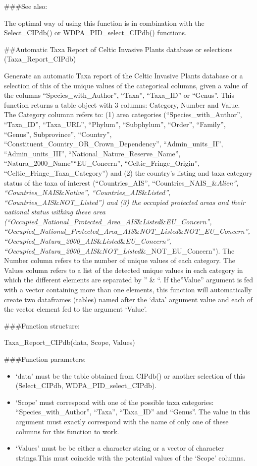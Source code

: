 \documentclass[
]{article}
\providecommand{\tightlist}{%
  \setlength{\itemsep}{0pt}\setlength{\parskip}{0pt}}
\begin{document}
\#\#\#See also:

The optimal way of using this function is in combination with the
Select\_CIPdb() or WDPA\_PID\_select\_CIPdb() functions.

\#\#Automatic Taxa Report of Celtic Invasive Plants database or
selections (Taxa\_Report\_CIPdb)

Generate an automatic Taxa report of the Celtic Invasive Plants database
or a selection of this of the unique values of the categorical columns,
given a value of the columns ``Species\_with\_Author'', ``Taxa'',
``Taxa\_ID'' or ``Genus''. This function returns a table object with 3
columns: Category, Number and Value. The Category columnn refers to: (1)
area categories (``Species\_with\_Author'', ``Taxa\_ID'', ``Taxa\_URL'',
``Phylum'', ``Subphylum'', ``Order'', ``Family'', ``Genus'',
Subprovince'', ``Country'',
``Constituent\_Country\_OR\_Crown\_Dependency'', ``Admin\_units\_II'',
``Admin\_units\_III'', ``National\_Nature\_Reserve\_Name'',
``Natura\_2000\_Name''``EU\_Concern'', ``Celtic\_Fringe\_Origin'',
``Celtic\_Fringe\_Taxa\_Category'') and (2) the country's listing and
taxa category status of the taxa of interest (``Countries\_AIS'',
``Countries\_NAIS\_\&\emph{Alien'', ``Countries\_NAIS}\&\emph{Native'',
``Countries\_AIS}\&\emph{Listed'',
``Countries\_AIS}\&\emph{NOT\_Listed'') and (3) the occupied protected
areas and their national status withing these area
(``Occupied\_National\_Protected\_Area\_AIS}\&\emph{Listed}\&\emph{EU\_Concern'',
``Occupied\_National\_Protected\_Area\_AIS}\&\emph{NOT\_Listed}\&\emph{NOT\_EU\_Concern'',
``Occupied\_Natura\_2000\_AIS}\&\emph{Listed}\&\emph{EU\_Concern'',
``Occupied\_Natura\_2000\_AIS}\&\emph{NOT\_Listed}\&\_NOT\_EU\_Concern'').
The Number column refers to the number of unique values of each
category. The Values column refers to a list of the detected unique
values in each category in which the different elements are separated by
'' \& ``. If the''Value'' argument is fed with a vector containing more
than one elements, this function will automatically create two
dataframes (tables) named after the `data' argument value and each of
the vector element fed to the argument `Value'.

\#\#\#Function structure:

Taxa\_Report\_CIPdb(data, Scope, Values)

\#\#\#Function parameters:

\begin{itemize}
\tightlist
\item
  `data' must be the table obtained from CIPdb() or another selection of
  this (Select\_CIPdb, WDPA\_PID\_select\_CIPdb).
\item
  `Scope' must correspond with one of the possible taxa categories:
  ``Species\_with\_Author'', ``Taxa'', ``Taxa\_ID'' and ``Genus''. The
  value in this argument must exactly correspond with the name of only
  one of these columns for this function to work.
\item
  `Values' must be be either a character string or a vector of character
  strings.This must coincide with the potential values of the `Scope'
  columns.
\end{itemize}
\end{document}
